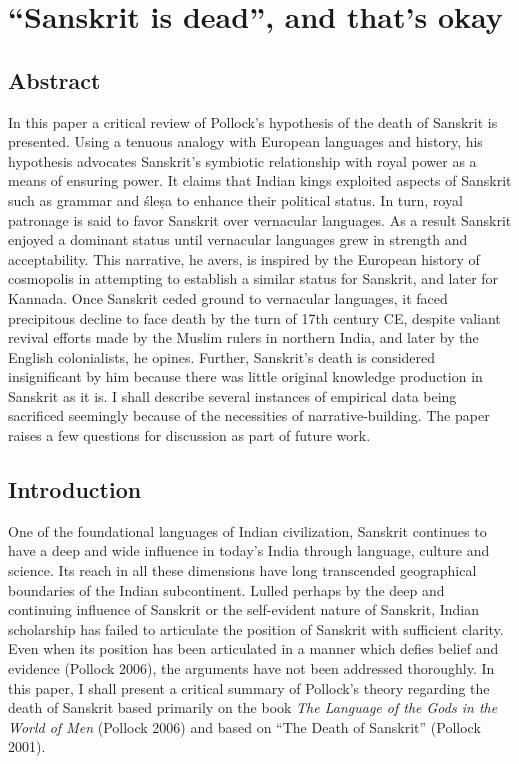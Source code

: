 \chapter{``Sanskrit is dead'', and that’s okay}\label{chapter4}

\section*{Abstract}

In this paper a critical review of Pollock’s hypothesis of the death of Sanskrit is presented. Using a tenuous analogy with European languages and history, his hypothesis advocates Sanskrit’s symbiotic relationship with royal power as a means of ensuring power. It claims that Indian kings exploited aspects of Sanskrit such as grammar and śleṣa to enhance their political status. In turn, royal patronage is said to favor Sanskrit over vernacular languages. As a result Sanskrit enjoyed a dominant status until vernacular languages grew in strength and acceptability. This narrative, he avers, is inspired by the European history of cosmopolis in attempting to establish a similar status for Sanskrit, and later for Kannada. Once Sanskrit ceded ground to vernacular languages, it faced precipitous decline to face death by the turn of 17th century CE, despite valiant revival efforts made by the Muslim rulers in northern India, and later by the English colonialists, he opines. Further, Sanskrit’s death is considered insignificant by him because there was little original knowledge production in Sanskrit as it is. I shall describe several instances of empirical data being sacrificed seemingly because of the necessities of narrative-building. The paper raises a few questions for discussion as part of future work.

\section*{Introduction}

One of the foundational languages of Indian civilization, Sanskrit continues to have a deep and wide influence in today’s India through language, culture and science. Its reach in all these dimensions have long transcended geographical boundaries of the Indian subcontinent. Lulled perhaps by the deep and continuing influence of Sanskrit or the self-evident nature of Sanskrit, Indian scholarship has failed to articulate the position of Sanskrit with sufficient clarity. Even when its position has been articulated in a manner which defies belief and evidence (Pollock 2006), the arguments have not been addressed thoroughly. In this paper, I shall present a critical summary of Pollock’s theory regarding the death of Sanskrit based primarily on the book {\sl The Language of the Gods in the World of Men} (Pollock 2006) and based on “The Death of Sanskrit” (Pollock 2001).

